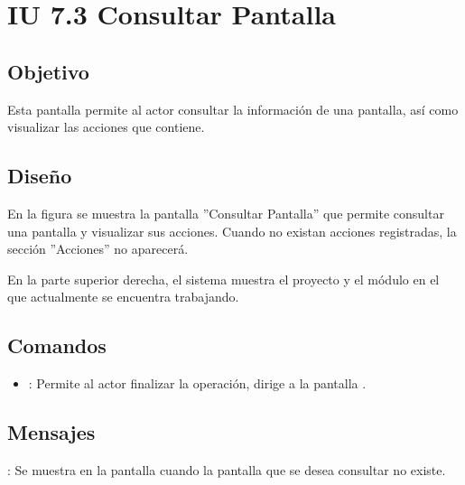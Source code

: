 \section{IU 7.3 Consultar Pantalla}

\subsection{Objetivo}
	Esta pantalla permite al actor consultar la información de una pantalla, así como visualizar las acciones que contiene.
\subsection{Diseño}
	En la figura  se muestra la pantalla ''Consultar Pantalla'' que permite consultar una pantalla y visualizar sus acciones. Cuando no existan acciones registradas, la sección ''Acciones'' no aparecerá.
	
	En la parte superior derecha, el sistema muestra el proyecto y el módulo en el que actualmente se encuentra trabajando.

\subsection{Comandos}
\begin{itemize}
	\item {}: Permite al actor finalizar la operación, dirige a la pantalla .
\end{itemize}

\subsection{Mensajes}

\begin{Citemize}
	\item {}: Se muestra en la pantalla  cuando la pantalla que se desea consultar no existe.
\end{Citemize}
